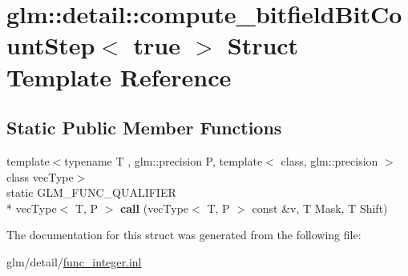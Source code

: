 \hypertarget{structglm_1_1detail_1_1compute__bitfieldBitCountStep_3_01true_01_4}{\section{glm\-:\-:detail\-:\-:compute\-\_\-bitfield\-Bit\-Count\-Step$<$ true $>$ Struct Template Reference}
\label{structglm_1_1detail_1_1compute__bitfieldBitCountStep_3_01true_01_4}
}
\subsection*{Static Public Member Functions}
\begin{DoxyCompactItemize}
\item 
\hypertarget{structglm_1_1detail_1_1compute__bitfieldBitCountStep_3_01true_01_4_a110f77247fc4566bb74e9188ceffa487}{{\footnotesize template$<$typename T , glm\-::precision P, template$<$ class, glm\-::precision $>$ class vec\-Type$>$ }\\static G\-L\-M\-\_\-\-F\-U\-N\-C\-\_\-\-Q\-U\-A\-L\-I\-F\-I\-E\-R \\*
vec\-Type$<$ T, P $>$ {\bfseries call} (vec\-Type$<$ T, P $>$ const \&v, T Mask, T Shift)}\label{structglm_1_1detail_1_1compute__bitfieldBitCountStep_3_01true_01_4_a110f77247fc4566bb74e9188ceffa487}

\end{DoxyCompactItemize}


The documentation for this struct was generated from the following file\-:\begin{DoxyCompactItemize}
\item 
glm/detail/\hyperlink{func__integer_8inl}{func\-\_\-integer.\-inl}\end{DoxyCompactItemize}
